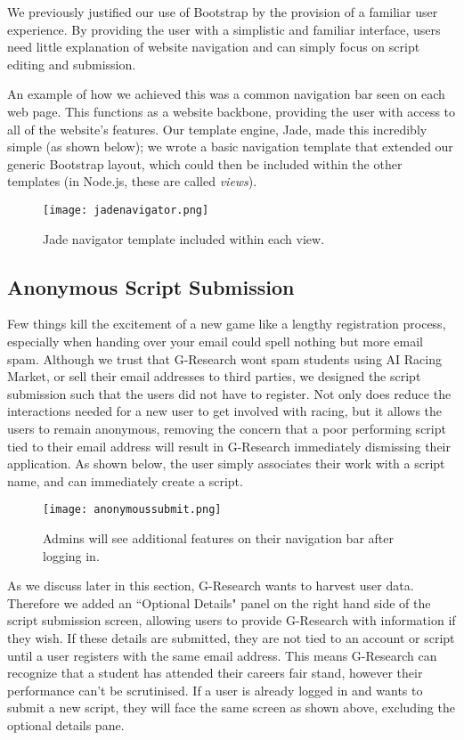 We previously justified our use of Bootstrap by the provision of a familiar user experience. By providing the user with a simplistic and familiar interface, users need little explanation of website navigation and can simply focus on script editing and submission. 

An example of how we achieved this was a common navigation bar seen on each web page. This functions as a website backbone, providing the user with access to all of the website's  features. Our template engine, Jade, made this incredibly simple (as shown below); we wrote a basic navigation template that extended our generic Bootstrap layout, which could then be included within the other templates (in Node.js, these are called {\it views}). 

\begin{figure}[H]
\centering
\texttt{[image: jadenavigator.png]}
\caption{Jade navigator template included within each view.}
\end{figure}

\subsection{Anonymous Script Submission}

Few things kill the excitement of a new game like a lengthy registration process, especially when handing over your email could spell nothing but more email spam. Although we trust that G-Research wont spam students using AI Racing Market, or sell their email addresses to third parties, we designed the script submission such that the users did not have to register. Not only does reduce the interactions needed for a new user to get involved with racing, but it allows the users to remain anonymous, removing the concern that a poor performing script tied to their email address will result in G-Research immediately dismissing their application. As shown below, the user simply associates their work with a script name, and can immediately create a script.

\begin{figure}[H]
\centering
\texttt{[image: anonymoussubmit.png]}
\caption{Admins will see additional features on their navigation bar after logging in.}
\end{figure}

As we discuss later in this section, G-Research wants to harvest user data.  Therefore we added an ``Optional Details" panel on the right hand side of the script submission screen, allowing users to provide G-Research with information if they wish. If these details are submitted, they are not tied to an account or script until a user registers with the same email address. This means G-Research can recognize that a student has attended their careers fair stand, however their performance can't be scrutinised. If a user is already logged in and wants to submit a new script, they will face the same screen as shown above, excluding the optional details pane.

